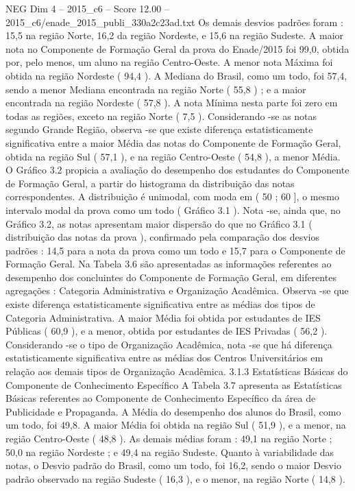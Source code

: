 \begin{textsample}{NEG Dim 4 – 2015\_c6 – Score 12.00 – 2015\_c6/enade\_2015\_publi\_330a2c23ad.txt}
Os demais desvios padrões foram : 15,5 na região Norte, 16,2 da região Nordeste, e 15,6 na região Sudeste.
A maior nota no Componente de Formação Geral da prova do Enade/2015 foi 99,0, obtida por, pelo menos, um aluno na região Centro-Oeste.
A menor nota Máxima foi obtida na região Nordeste ( 94,4 ).
A Mediana do Brasil, como um todo, foi 57,4, sendo a menor Mediana encontrada na região Norte ( 55,8 ) ; e a maior encontrada na região Nordeste ( 57,8 ).
A nota Mínima nesta parte foi zero em todas as regiões, exceto na região Norte ( 7,5 ).
Considerando -se as notas segundo Grande Região, observa -se que existe diferença estatisticamente significativa entre a maior Média das notas do Componente de Formação Geral, obtida na região Sul ( 57,1 ), e na região Centro-Oeste ( 54,8 ), a menor Média.
O Gráfico 3.2 propicia a avaliação do desempenho dos estudantes do Componente de Formação Geral, a partir do histograma da distribuição das notas correspondentes.
A distribuição é unimodal, com moda em ( 50 ; 60 ], o mesmo intervalo modal da prova como um todo ( Gráfico 3.1 ).
Nota -se, ainda que, no Gráfico 3.2, as notas apresentam maior dispersão do que no Gráfico 3.1 ( distribuição das notas da prova ), confirmado pela comparação dos desvios padrões : 14,5 para a nota da prova como um todo e 15,7 para o Componente de Formação Geral.
Na Tabela 3.6 são apresentadas as informações referentes ao desempenho dos concluintes do Componente de Formação Geral, em diferentes agregações : Categoria Administrativa e Organização Acadêmica.
Observa -se que existe diferença estatisticamente significativa entre as médias dos tipos de Categoria Administrativa.
A maior Média foi obtida por estudantes de IES Públicas ( 60,9 ), e a menor, obtida por estudantes de IES Privadas ( 56,2 ).
Considerando -se o tipo de Organização Acadêmica, nota -se que há diferença estatisticamente significativa entre as médias dos Centros Universitários em relação aos demais tipos de Organização Acadêmica. 3.1.3 Estatísticas Básicas do Componente de Conhecimento Específico A Tabela 3.7 apresenta as Estatísticas Básicas referentes ao Componente de Conhecimento Específico da área de Publicidade e Propaganda.
A Média do desempenho dos alunos do Brasil, como um todo, foi 49,8.
A maior Média foi obtida na região Sul ( 51,9 ), e a menor, na região Centro-Oeste ( 48,8 ).
As demais médias foram : 49,1 na região Norte ; 50,0 na região Nordeste ; e 49,4 na região Sudeste.
Quanto à variabilidade das notas, o Desvio padrão do Brasil, como um todo, foi 16,2, sendo o maior Desvio padrão observado na região Sudeste ( 16,3 ), e o menor, na região Norte ( 14,8 ).

\end{textsample}
